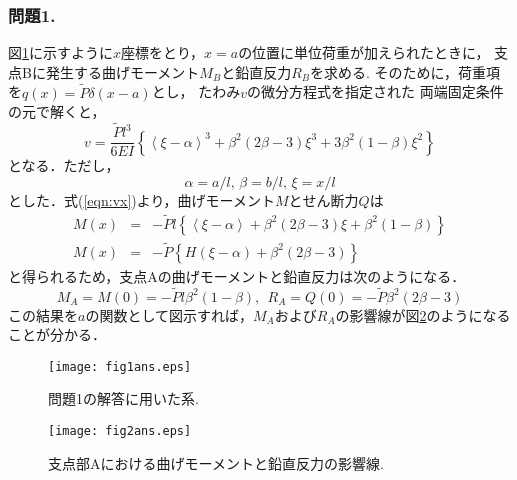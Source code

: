 ﻿\documentclass[10pt,a4j]{jarticle}
\begin{document}
\subsubsection*{問題1.}
図\ref{fig:fig1}に示すように$x$座標をとり，$x=a$の位置に単位荷重が加えられたときに，
支点Bに発生する曲げモーメント$M_B$と鉛直反力$R_B$を求める.
そのために，荷重項を$q(x)=\tilde P \delta (x-a)$とし， たわみ$v$の微分方程式を指定された
両端固定条件の元で解くと，
\begin{equation}
	v=\frac{\tilde Pl^3}{6EI}\left\{
		\left< \xi-\alpha \right>^3 +\beta^2(2\beta -3)\xi^3 +3\beta^2(1-\beta) \xi^2 
	 \right\}
	\label{eqn:vx}
\end{equation}
となる．ただし，
\begin{equation}
	\alpha=a/l,\, \beta=b/l, \, \xi=x/l
\end{equation}
とした．式(\ref{eqn:vx})より，曲げモーメント$M$とせん断力$Q$は
\begin{eqnarray}
	M(x) &=& 
	-\tilde Pl
	\left\{
		\left< \xi-\alpha \right> +\beta^2(2\beta -3)\xi+\beta^2(1-\beta)
 	\right\}
	\\
	M(x) &=& 
	-\tilde P
	\left\{
		H(\xi-\alpha) +\beta^2(2\beta -3)
 	\right\}
\end{eqnarray}
と得られるため，支点Aの曲げモーメントと鉛直反力は次のようになる．
\begin{equation}
	M_A=M(0)=-\tilde P l \beta^2(1-\beta), \ \ 
	R_A=Q(0)=-\tilde P \beta^2 ( 2\beta-3)
\end{equation}
この結果を$a$の関数として図示すれば，$M_A$および$R_A$の影響線が図\ref{fig:fig2}のようになることが分かる．
\begin{figure}[h]
	\begin{center}
	\texttt{[image: fig1ans.eps]}
	\end{center}
	\caption{問題1の解答に用いた系.}
	\label{fig:fig1}
\end{figure}
\begin{figure}[h]
	\begin{center}
	\texttt{[image: fig2ans.eps]} 
	\end{center}
	\caption{支点部Aにおける曲げモーメントと鉛直反力の影響線.}
	\label{fig:fig2}
\end{figure}
%
%
\end{document}
